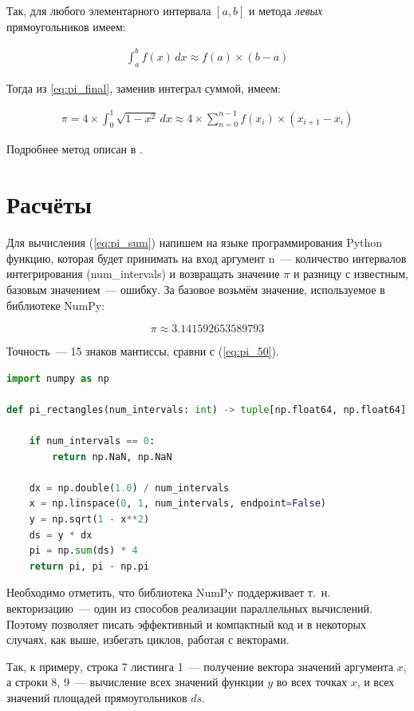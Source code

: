 \documentclass[a4paper,12pt]{article}
\begin{document}
Так, для любого элементарного интервала $[a,b]$ и метода \textit{левых} прямоугольников имеем:

\begin{align}\label{eq:rect_approx}
    \int_{a}^{b} f(x)\,dx \approx f(a)\times (b-a)
\end{align}

Тогда из \ref{eq:pi_final}, заменив интеграл суммой, имеем:

\begin{align}\label{eq:pi_sum}
    \pi = 4 \times \int_{0}^{1} \sqrt{1-x^2} \,dx \approx 4 \times \sum_{n = 0}^{n-1} f(x_i)\times(x_{i+1}-x_i)
\end{align}

Подробнее метод описан в \cite{rect}.

\section{Расчёты}

Для вычисления (\ref{eq:pi_sum}) напишем на языке программирования Python функцию, которая будет принимать на вход аргумент n~--- количество интервалов интегрирования (num\_intervals) и возвращать значение $\pi$ и разницу с известным, базовым значением~--- ошибку. За базовое возьмём значение, используемое в библиотеке NumPy:

$$\pi \approx 3.141592653589793$$

Точность~--- 15 знаков мантиссы, сравни с (\ref{eq:pi_50}).


\begin{lstlisting}[language=Python, caption=Функция вычисления $\pi$ и ошибки]
import numpy as np

def pi_rectangles(num_intervals: int) -> tuple[np.float64, np.float64]:

    if num_intervals == 0:
        return np.NaN, np.NaN
    
    dx = np.double(1.0) / num_intervals
    x = np.linspace(0, 1, num_intervals, endpoint=False)
    y = np.sqrt(1 - x**2)
    ds = y * dx
    pi = np.sum(ds) * 4
    return pi, pi - np.pi    
\end{lstlisting}    

Необходимо отметить, что библиотека NumPy поддерживает т.\ н. векторизацию~--- один из способов реализации параллельных вычислений. Поэтому позволяет писать эффективный и компактный код и в некоторых случаях, как выше, избегать циклов, работая с векторами.

Так, к примеру, строка 7 листинга 1~--- получение вектора значений аргумента $x$, а строки 8, 9~--- вычисление всех значений функции $y$ во всех точках $x$, и всех значений площадей прямоугольников $ds$.
\end{document}
